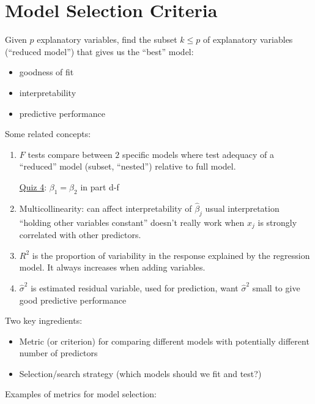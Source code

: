 \section{Model Selection Criteria}
Given $ p $ explanatory variables, find the subset
$ k\leqslant p $ of explanatory variables
(``reduced model'') that gives us
the ``best'' model:
\begin{itemize}
    \item goodness of fit
    \item interpretability
    \item predictive performance
\end{itemize}

Some related concepts:
\begin{enumerate}
    \item $ F $ tests compare between $ 2 $
          specific models where test adequacy of
          a ``reduced'' model (subset, ``nested'')
          relative to full model.

          \underline{Quiz 4}: $ \beta_1=\beta_2 $
          in part d-f
    \item Multicollinearity: can affect interpretability
          of $ \hat{\beta}_j $ usual interpretation
          ``holding other variables constant''
          doesn't really work when $ x_j $ is
          strongly correlated with other predictors.
    \item $ R^2 $ is the proportion
          of variability in the response explained by
          the regression model. It always increases
          when adding variables.
    \item $ \hat{\sigma}^2 $ is estimated residual variable,
          used for prediction, want $ \hat{\sigma}^2 $ small
          to give good predictive performance
\end{enumerate}
Two key ingredients:
\begin{itemize}
    \item Metric (or criterion) for comparing
          different models with potentially different number
          of predictors
    \item Selection/search strategy (which models
          should we fit and test?)
\end{itemize}
Examples of metrics for model selection:

